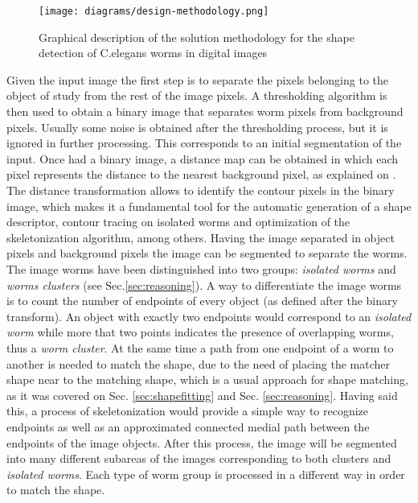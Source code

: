 \begin{figure}[h t b p ! H]
 \centering
   \texttt{[image: diagrams/design-methodology.png]}
 \caption{Graphical description of the solution methodology for the shape detection
 of C.elegans worms in digital images}
\label{fig:methsol}
\end{figure}

Given the input image the first step is to separate the pixels belonging to the object
of study from the rest of the image pixels. A thresholding algorithm is then used to
obtain a binary image that separates worm pixels from background pixels. Usually some
noise is obtained after the thresholding process, but it is ignored in further processing.
This corresponds to an initial segmentation of the input. Once had a binary image, a
distance map can be obtained in which each pixel represents the distance to the 
nearest background pixel, as explained on \cite{dtresearch}. The distance transformation
allows to identify the contour pixels in the binary image, which makes it a fundamental
tool for the automatic generation of a shape descriptor, contour tracing on isolated worms 
and optimization of the skeletonization algorithm, among others. Having the image 
separated in object pixels and background pixels the image can be segmented to separate
the worms. \\

The image worms have been distinguished into two groups: \emph{isolated worms}
and \emph{worms clusters} (see Sec.\ref{sec:reasoning}). A way to differentiate the image worms
is to count the number of endpoints of every object (as defined after the binary transform).
An object with exactly two endpoints would correspond to an \emph{isolated worm} while
more that two points indicates the presence of overlapping worms, thus a \emph{worm cluster}.
At the same time a path from one endpoint of a worm to another is needed to match
the shape, due to the need of placing the matcher shape near to the matching shape, which
is a usual approach for shape matching, as it was covered on Sec. \ref{sec:shapefitting} and
Sec. \ref{sec:reasoning}. Having said this, a process of skeletonization would provide a simple
way to recognize endpoints as well as an approximated connected medial path between the
endpoints of the image objects. After this process, the image will be segmented into 
many different subareas of the images corresponding to both clusters and \emph{isolated
worms}. Each type of worm group is processed in a different way in order to match
the shape.\\

